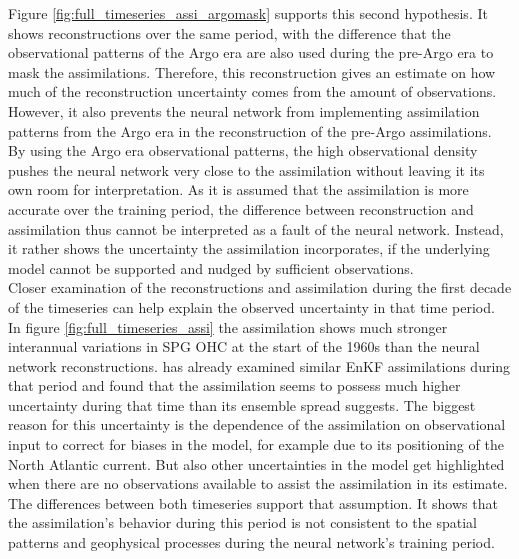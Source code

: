 \documentclass[Masterarbeit.tex]{subfile}
\begin{document}
	
	Figure \ref{fig:full_timeseries_assi_argomask} supports this second hypothesis. It shows reconstructions over the same period, with the difference that the observational patterns of the Argo era are also used during the pre-Argo era to mask the assimilations. Therefore, this reconstruction gives an estimate on how much of the reconstruction uncertainty comes from the amount of observations. However, it also prevents the neural network from implementing assimilation patterns from the Argo era in the reconstruction of the pre-Argo assimilations. By using the Argo era observational patterns, the high observational density pushes the neural network very close to the assimilation without leaving it its own room for interpretation. As it is assumed that the assimilation is more accurate over the training period, the difference between reconstruction and assimilation thus cannot be interpreted as a fault of the neural network. Instead, it rather shows the uncertainty the assimilation incorporates, if the underlying model cannot be supported and nudged by sufficient observations. \\
	Closer examination of the reconstructions and assimilation during the first decade of the timeseries can help explain the observed uncertainty in that time period. In figure \ref{fig:full_timeseries_assi} the assimilation shows much stronger interannual variations in SPG OHC at the start of the 1960s than the neural network reconstructions. \cite{vimal_personal} has already examined similar EnKF assimilations during that period and found that the assimilation seems to possess much higher uncertainty during that time than its ensemble spread suggests. The biggest reason for this uncertainty is the dependence of the assimilation on observational input to correct for biases in the model, for example due to its positioning of the North Atlantic current. But also other uncertainties in the model get highlighted when there are no observations available to assist the assimilation in its estimate.	
	The differences between both timeseries support that assumption. It shows that the assimilation's behavior during this period is not consistent to the spatial patterns and geophysical processes during the neural network's training period.\\
	
\end{document}
